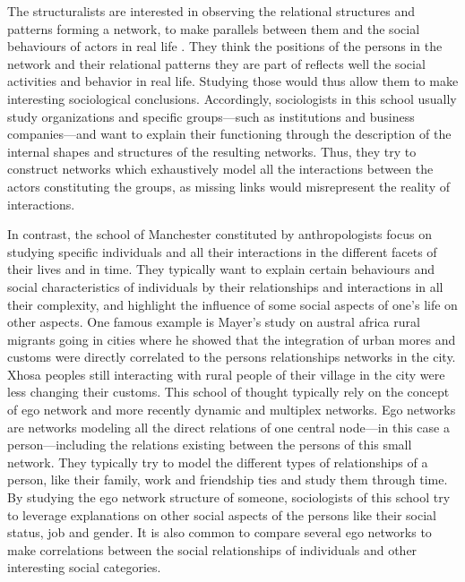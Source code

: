 The structuralists are interested in observing the relational structures and patterns forming a network, to make parallels between them and the social behaviours of actors in real life \cite{lazegaReseaux}.
They think the positions of the persons in the network and their relational patterns they are part of reflects well the social activities and behavior in real life.
Studying those would thus allow them to make interesting sociological conclusions.
Accordingly, sociologists in this school usually study organizations and specific groups---such as institutions and business companies---and want to explain their functioning through the description of the internal shapes and structures of the resulting networks.
Thus, they try to construct networks which exhaustively model all the interactions between the actors constituting the groups, as missing links would misrepresent the reality of interactions.

In contrast, the school of Manchester constituted by anthropologists focus on studying specific individuals and all their interactions in the different facets of their lives and in time.
They typically want to explain certain behaviours and social characteristics of individuals by their relationships and interactions in all their complexity,
and highlight the influence of some social aspects of one's life on other aspects.
One famous example is Mayer's study on austral africa rural migrants going in cities \cite{mayerMigrancyStudyAfricans1962} where he showed that the integration of urban mores and customs were directly correlated to the persons relationships networks in the city.
Xhosa peoples still interacting with rural people of their village in the city were less changing their customs.
This school of thought typically rely on the concept of ego network and more recently dynamic and multiplex networks.
Ego networks are networks modeling all the direct relations of one central node---in this case a person---including the relations existing between the persons of this small network.
They typically try to model the different types of relationships of a person, like their family, work and friendship ties and study them through time.
By studying the ego network structure of someone, sociologists of this school try to leverage explanations on other social aspects of the persons like their social status, job and gender.
It is also common to compare several ego networks to make correlations between the social relationships of individuals and other interesting social categories.

